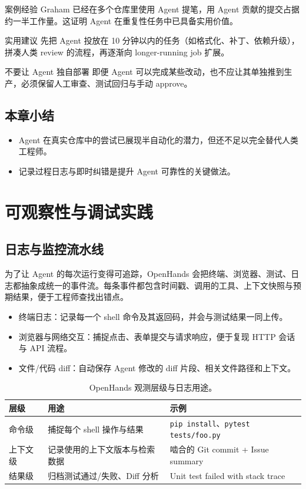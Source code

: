 \documentclass[a4paper]{article}
\begin{document}
\begin{knowledgebox}{案例经验}
Graham 已经在多个仓库里使用 Agent 提笔，用 Agent 贡献的提交占据约一半工作量。这证明 Agent 在重复性任务中已具备实用价值。
\end{knowledgebox}

\begin{importantbox}{实用建议}
先把 Agent 投放在 10 分钟以内的任务（如格式化、补丁、依赖升级），拼凑人类 review 的流程，再逐渐向 longer-running job 扩展。
\end{importantbox}

\begin{warningbox}{不要让 Agent 独自部署}
即便 Agent 可以完成某些改动，也不应让其单独推到生产，必须保留人工审查、测试回归与手动 approve。
\end{warningbox}

\subsection{本章小结}
\begin{itemize}
    \item Agent 在真实仓库中的尝试已展现半自动化的潜力，但还不足以完全替代人类工程师。
    \item 记录过程日志与即时纠错是提升 Agent 可靠性的关键做法。
\end{itemize}

\section{可观察性与调试实践}
\subsection{日志与监控流水线}
为了让 Agent 的每次运行变得可追踪，OpenHands 会把终端、浏览器、测试、日志都抽象成统一的事件流。每条事件都包含时间戳、调用的工具、上下文快照与预期结果，便于工程师查找出错点。

\begin{itemize}
    \item 终端日志：记录每一个 shell 命令及其返回码，并会与测试结果一同上传。
    \item 浏览器与网络交互：捕捉点击、表单提交与请求响应，便于复现 HTTP 会话与 API 流程。
    \item 文件/代码 diff：自动保存 Agent 修改的 diff 片段、相关文件路径和上下文。
\end{itemize}

\begin{table}[H]
\centering
\begin{tabular}{p{} p{} p{}}
\toprule
层级 & 用途 & 示例 \\
\midrule
命令级 & 捕捉每个 shell 操作与结果 & \texttt{pip install}、\texttt{pytest tests/foo.py} \\
\midrule
上下文级 & 记录使用的上下文版本与检索数据 & 啮合的 Git commit + Issue summary \\
\midrule
结果级 & 归档测试通过/失败、Diff 分析 & Unit test failed with stack trace \\
\bottomrule
\end{tabular}
\caption{OpenHands 观测层级与日志用途。}
\end{table}
\end{document}

